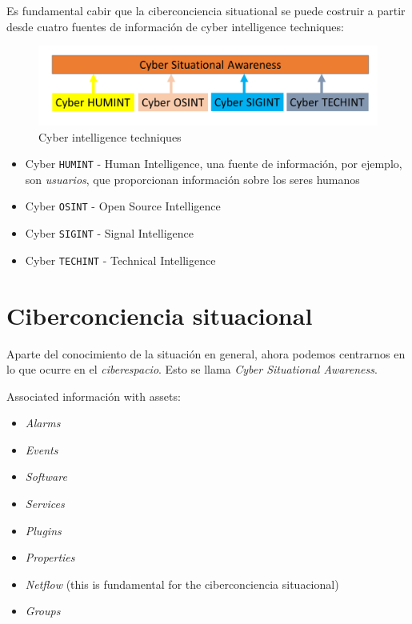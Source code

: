Es fundamental cabir que la ciberconciencia situational se puede costruir a partir desde cuatro fuentes de información de cyber intelligence techniques:
\begin{figure}[htbp]
   \centering
   \includegraphics{images/01/CS_CI.png}
   \caption{Cyber intelligence techniques}
   \label{fig:01/CS_CI}
\end{figure}

\begin{itemize}
   \item Cyber \texttt{HUMINT} - Human Intelligence, una fuente de información, por ejemplo, son \textit{usuarios}, que proporcionan información sobre los seres humanos
   \item Cyber \texttt{OSINT} - Open Source Intelligence
   \item Cyber \texttt{SIGINT} - Signal Intelligence
   \item Cyber \texttt{TECHINT} - Technical Intelligence 
\end{itemize}


\section{Ciberconciencia situacional}
Aparte del conocimiento de la situación en general, ahora podemos centrarnos en lo que ocurre en el \textit{ciberespacio}. Esto se llama \textit{Cyber Situational Awareness}.

Associated información with assets:
\begin{itemize}
   \item \textit{Alarms}
   \item \textit{Events}
   \item \textit{Software}
   \item \textit{Services}
   \item \textit{Plugins}
   \item \textit{Properties}
   \item \textit{Netflow} (this is fundamental for the ciberconciencia situacional)
   \item \textit{Groups}
\end{itemize}


